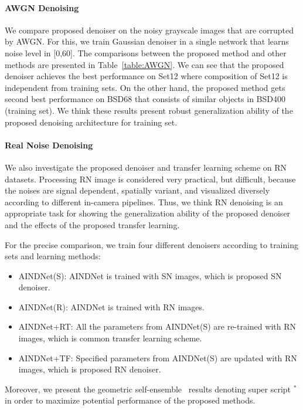 \documentclass[10pt,twocolumn,letterpaper]{article}
\begin{document}
\paragraph{AWGN Denoising}
We compare proposed denoiser on the noisy grayscale images that are corrupted by AWGN.
For this, we train Gaussian denoiser in a single network that learns noise level in [0,60].
The comparisons between the proposed method and other methods are presented in Table~\ref{table:AWGN}.
We can see that the proposed denoiser achieves the best performance on Set12 where composition of Set12 is independent from training sets.
On the other hand, the proposed method gets second best performance on BSD68 that consists of similar objects in BSD400 (training set).  
We think these results present robust generalization ability of the proposed denoising architecture for training set.

\paragraph{Real Noise Denoising}
We also investigate the proposed denoiser and transfer learning scheme on RN datasets.
Processing RN image is considered very practical, but difficult, because the noises are signal dependent, spatially variant, and visualized diversely according to different in-camera pipelines. Thus, we think RN denoising is an appropriate task for showing the generalization ability of the proposed denoiser and the effects of the proposed transfer learning. 

For the precise comparison, we train four different denoisers according to training sets and learning methods:
\begin{itemize}
	\item AINDNet(S): AINDNet is trained with SN images, which is proposed SN denoiser.
	\item AINDNet(R): AINDNet is trained with RN images.	
	\item AINDNet+RT: All the parameters from AINDNet(S) are re-trained with RN images, which is common transfer learning scheme.		
	\item AINDNet+TF: Specified parameters from AINDNet(S) are updated with RN images, which is proposed RN denoiser.	
\end{itemize}
Moreover, we present the geometric self-ensemble~\cite{timofte2016seven} results denoting super script $^*$ in order to maximize potential performance of the proposed methods.
\end{document}
